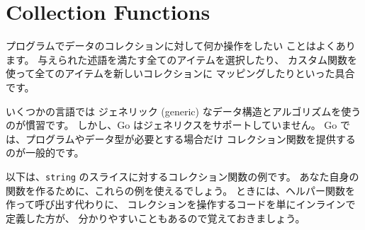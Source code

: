\section{Collection Functions}

プログラムでデータのコレクションに対して何か操作をしたい ことはよくあります。 与えられた述語を満たす全てのアイテムを選択したり、 カスタム関数を使って全てのアイテムを新しいコレクションに マッピングしたりといった具合です。

いくつかの言語では ジェネリック (generic) なデータ構造とアルゴリズムを使うのが慣習です。 しかし、Go はジェネリクスをサポートしていません。 Go では、プログラムやデータ型が必要とする場合だけ コレクション関数を提供するのが一般的です。

以下は、\texttt{string} のスライスに対するコレクション関数の例です。 あなた自身の関数を作るために、これらの例を使えるでしょう。 ときには、ヘルパー関数を作って呼び出す代わりに、 コレクションを操作するコードを単にインラインで定義した方が、 分かりやすいこともあるので覚えておきましょう。




